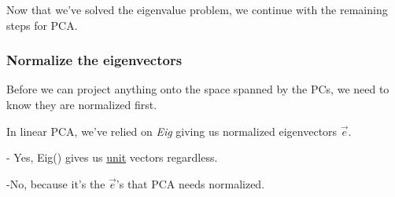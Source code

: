 \begin{frame}


\pause

Now that we've solved the eigenvalue problem, we continue with the remaining steps for PCA.

\pause



\end{frame}

\subsubsection{Normalize the eigenvectors}

\begin{frame}{\subsecname}

Before we can project anything onto the space spanned by the PCs, we need to know they are normalized first.

In linear PCA, we've relied on \textit{Eig} giving us normalized eigenvectors $\vec e$. 


\pause

- Yes, Eig() gives us \underline{unit} vectors regardless.

\pause


\pause

-No, because it's the $\vec e$'s that PCA needs normalized.

\end{frame}

